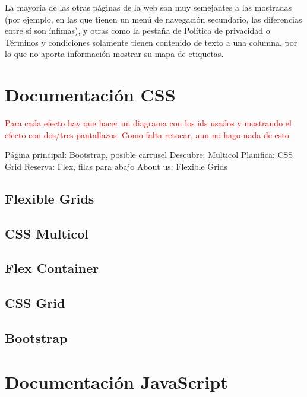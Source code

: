 \documentclass[11pt, a4paper]{book}
\begin{document}
	La mayoría de las otras páginas de la web son muy semejantes a las mostradas (por ejemplo, en las que tienen un menú de navegación secundario, las diferencias entre sí son ínfimas), y otras como la pestaña de Política de privacidad o Términos y condiciones solamente tienen contenido de texto a una columna, por lo que no aporta información mostrar su mapa de etiquetas.
	
	
	
	
	
	
	
	\chapter{Documentación CSS}
	
	\textcolor{red}{Para cada efecto hay que hacer un diagrama con los ids usados y mostrando el efecto con dos/tres pantallazos. Como falta retocar, aun no hago nada de esto}
	
	Página principal: Bootstrap, posible carrusel
	Descubre: Multicol
	Planifica: CSS Grid
	Reserva: Flex, filas para abajo
	About us: Flexible Grids
	
	\section{Flexible Grids}
	\section{CSS Multicol}
	\section{Flex Container}
	\section{CSS Grid}
	\section{Bootstrap}
	

	
	
	
	
	
	
	\chapter{Documentación JavaScript}
	
\end{document}

